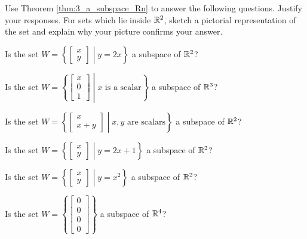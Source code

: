 \begin{activity} \label{act:3_a_1} Use Theorem \ref{thm:3_a_subspace_Rn} to answer the following questions. Justify your responses. For sets which lie inside $\mathbb{R}^2$, sketch a pictorial representation of the set and explain why your picture confirms your answer.

\ba
\item Is the set $W = \left\{ \left[ \begin{array}{c} x \\ y \end{array} \right] \middle| y = 2x\right\}$ a subspace of $\mathbb{R}^2$? 



\item Is the set $W = \left\{ \left[ \begin{array}{c} x \\ 0 \\ 1 \end{array} \right] \middle| x \text{ is a scalar}\right\}$ a subspace of $\mathbb{R}^3$?




\item Is the set $W = \left\{ \left[ \begin{array}{c} x \\ x+y \end{array} \right] \middle| x, y \text{ are scalars}\right\}$ a subspace of $\mathbb{R}^2$? 



\item Is the set $W = \left\{ \left[ \begin{array}{c} x \\ y \end{array} \right] \middle| y = 2x+1\right\}$ a subspace of $\mathbb{R}^2$? 



\item Is the set $W = \left\{ \left[ \begin{array}{c} x \\ y \end{array} \right] \middle| y=x^2\right\}$ a subspace of $\mathbb{R}^2$? 



\item Is the set $W = \left\{ \left[ \begin{array}{c} 0 \\ 0 \\ 0 \\ 0 \end{array} \right]\right\}$ a subspace of $\mathbb{R}^4$?




\end{activity}
